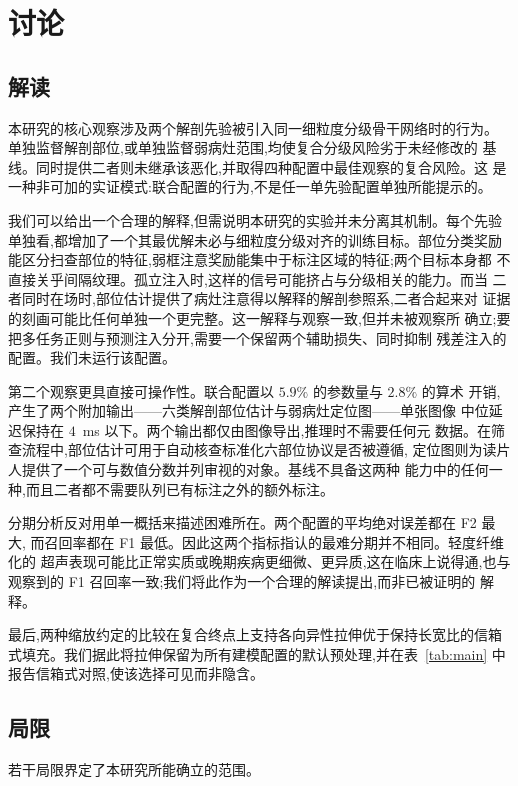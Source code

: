 \section{讨论}
\label{sec:discussion}

\subsection{解读}

本研究的核心观察涉及两个解剖先验被引入同一细粒度分级骨干网络时的行为。
单独监督解剖部位,或单独监督弱病灶范围,均使复合分级风险劣于未经修改的
基线。同时提供二者则未继承该恶化,并取得四种配置中最佳观察的复合风险。这
是一种非可加的实证模式:联合配置的行为,不是任一单先验配置单独所能提示的。

我们可以给出一个合理的解释,但需说明本研究的实验并未分离其机制。每个先验
单独看,都增加了一个其最优解未必与细粒度分级对齐的训练目标。部位分类奖励
能区分扫查部位的特征,弱框注意奖励能集中于标注区域的特征;两个目标本身都
不直接关乎间隔纹理。孤立注入时,这样的信号可能挤占与分级相关的能力。而当
二者同时在场时,部位估计提供了病灶注意得以解释的解剖参照系,二者合起来对
证据的刻画可能比任何单独一个更完整。这一解释与观察一致,但并未被观察所
确立;要把多任务正则与预测注入分开,需要一个保留两个辅助损失、同时抑制
残差注入的配置。我们未运行该配置。

第二个观察更具直接可操作性。联合配置以 $5.9\%$ 的参数量与 $2.8\%$ 的算术
开销,产生了两个附加输出——六类解剖部位估计与弱病灶定位图——单张图像
中位延迟保持在 $4$~ms 以下。两个输出都仅由图像导出,推理时不需要任何元
数据。在筛查流程中,部位估计可用于自动核查标准化六部位协议是否被遵循,
定位图则为读片人提供了一个可与数值分数并列审视的对象。基线不具备这两种
能力中的任何一种,而且二者都不需要队列已有标注之外的额外标注。

分期分析反对用单一概括来描述困难所在。两个配置的平均绝对误差都在 F2 最大,
而召回率都在 F1 最低。因此这两个指标指认的最难分期并不相同。轻度纤维化的
超声表现可能比正常实质或晚期疾病更细微、更异质,这在临床上说得通,也与
观察到的 F1 召回率一致;我们将此作为一个合理的解读提出,而非已被证明的
解释。

最后,两种缩放约定的比较在复合终点上支持各向异性拉伸优于保持长宽比的信箱
式填充。我们据此将拉伸保留为所有建模配置的默认预处理,并在表~\ref{tab:main}
中报告信箱式对照,使该选择可见而非隐含。

\subsection{局限}

若干局限界定了本研究所能确立的范围。

